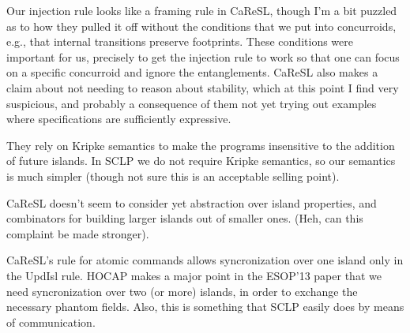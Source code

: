 Our injection rule looks like a framing rule in CaReSL, though I'm a
bit puzzled as to how they pulled it off without the conditions that
we put into concurroids, e.g., that internal transitions preserve
footprints. These conditions were important for us, precisely to get
the injection rule to work so that one can focus on a specific
concurroid and ignore the entanglements. CaReSL also makes a claim
about not needing to reason about stability, which at this point I
find very suspicious, and probably a consequence of them not yet
trying out examples where specifications are sufficiently expressive.

They rely on Kripke semantics to make the programs insensitive to the
addition of future islands. In SCLP we do not require Kripke
semantics, so our semantics is much simpler (though not sure this is
an acceptable selling point).

CaReSL doesn't seem to consider yet abstraction over island
properties, and combinators for building larger islands out of smaller
ones. (Heh, can this complaint be made stronger).


CaReSL's rule for atomic commands allows syncronization over one
island only in the UpdIsl rule. HOCAP makes a major point in the
ESOP'13 paper that we need syncronization over two (or more) islands,
in order to exchange the necessary phantom fields. Also, this is
something that SCLP easily does by means of communication.


